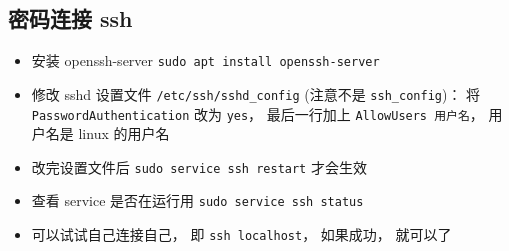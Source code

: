 
\begin{issues}
\issueDraft
\end{issues}

\subsection{密码连接 ssh}
\begin{itemize}
\item 安装 openssh-server \verb`sudo apt install openssh-server`
\item 修改 sshd 设置文件 \verb`/etc/ssh/sshd_config` (注意不是 \verb`ssh_config`)： 将 \verb`PasswordAuthentication` 改为 \verb`yes`， 最后一行加上 \verb`AllowUsers 用户名`， 用户名是 linux 的用户名
\item 改完设置文件后 \verb`sudo service ssh restart` 才会生效
\item 查看 service 是否在运行用  \verb`sudo service ssh status`
\item 可以试试自己连接自己， 即 \verb`ssh localhost`， 如果成功， 就可以了
\end{itemize}



